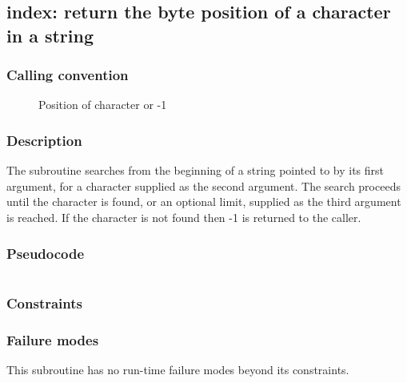 \clearpage
{}
{}
\label{subr:index}
\subsection*{index: return the byte position of a character in a string}

\subsubsection*{Calling convention}

\begin{description}
\item[] Position of character or -1 
\end{description}

\subsubsection*{Description}

The  subroutine searches from the beginning of a
string pointed to by its first argument, for a character supplied as
the second argument.  The search proceeds until the character is
found, or an optional limit, supplied as the third argument is
reached.  If the character is not found then -1 is returned to the
caller.

\subsubsection*{Pseudocode}

\begin{verbatim}
\end{verbatim}

\subsubsection*{Constraints}

\subsubsection*{Failure modes}

This subroutine has no run-time failure modes beyond its constraints.
